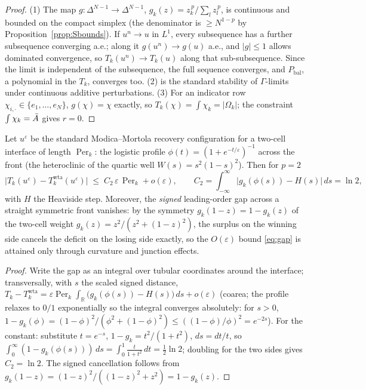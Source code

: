 \documentclass[11pt,a4paper]{article}
\begin{document}
\begin{proof}
(1) The map $g:\Delta^{N-1}\to\Delta^{N-1}$,
$g_k(z)=z_k^{\,p}/\sum_l z_l^{\,p}$, is continuous and bounded on the compact
simplex (the denominator is $\ge N^{1-p}$ by
Proposition~\ref{prop:Sbounds}). If $u^n\to u$ in $L^1$, every subsequence
has a further subsequence converging a.e.; along it $g(u^n)\to g(u)$ a.e.,
and $|g|\le1$ allows dominated convergence, so $T_k(u^n)\to T_k(u)$ along
that sub-subsequence. Since the limit is independent of the subsequence, the
full sequence converges, and $P_{\mathrm{bal}}$, a polynomial in the $T_k$,
converges too. (2) is the standard stability of $\Gamma$-limits under
continuous additive perturbations. (3) For an indicator row
$\chi_{i,\cdot}\in\{e_1,\dots,e_N\}$, $g(\chi)=\chi$ exactly, so
$T_k(\chi)=\int\chi_k=|\Omega_k|$; the constraint $\int\chi_k=\bar{A}$ gives
$r=0$.
\end{proof}

\begin{prop}
\label{prop:gap}
Let $u^\varepsilon$ be the standard Modica--Mortola recovery configuration
for a two-cell interface of length $\operatorname{Per}_k$: the logistic
profile $\phi(t)=(1+e^{-t/\varepsilon})^{-1}$ across the front (the
heteroclinic of the quartic well $W(s)=s^2(1-s)^2$). Then for $p=2$
\begin{equation}
  \bigl| T_k(u^\varepsilon) - T_k^{\mathrm{wta}}(u^\varepsilon) \bigr|
  \;\le\; C_2\,\varepsilon\, \operatorname{Per}_k + o(\varepsilon),
  \qquad
  C_2 = \int_{-\infty}^{\infty}
        \bigl| g_k(\phi(s)) - H(s) \bigr|\, ds
      = \ln 2 ,
  \label{eq:gap}
\end{equation}
with $H$ the Heaviside step. Moreover, the \emph{signed} leading-order gap
across a straight symmetric front vanishes: by the symmetry
$g_k(1-z)=1-g_k(z)$ of the two-cell weight
$g_k(z)=z^2/(z^2+(1-z)^2)$, the surplus on the winning side cancels the
deficit on the losing side exactly, so the $O(\varepsilon)$ bound
\eqref{eq:gap} is attained only through curvature and junction effects.
\end{prop}

\begin{proof}
Write the gap as an integral over tubular coordinates around the interface;
transversally, with $s$ the scaled signed distance,
$T_k - T_k^{\mathrm{wta}} = \varepsilon\operatorname{Per}_k
 \int_{\mathbb R}\bigl(g_k(\phi(s)) - H(s)\bigr)\,ds + o(\varepsilon)$
(coarea; the profile relaxes to $0/1$ exponentially so the integral
converges absolutely: for $s>0$,
$1-g_k(\phi)= (1-\phi)^2/(\phi^2+(1-\phi)^2) \le ((1-\phi)/\phi)^2
 = e^{-2s}$). For the constant: substitute $t=e^{-s}$,
$1-g_k = t^2/(1+t^2)$, $ds = dt/t$, so
$\int_0^\infty (1-g_k(\phi(s)))\,ds = \int_0^1 \frac{t}{1+t^2}\,dt
 = \tfrac12\ln2$; doubling for the two sides gives $C_2=\ln2$. The signed
cancellation follows from $g_k(1-z) = (1-z)^2/((1-z)^2+z^2) = 1-g_k(z)$.
\end{proof}
\end{document}
